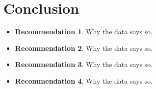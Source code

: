 \documentclass[12pt, letterpaper]{article}  %
\theoremstyle{definition}
\theoremstyle{remark}
\theoremstyle{plain}
\begin{document}


\section{Conclusion}\label{sec:conclusion}



\begin{itemize}
\item \textbf{Recommendation 1}.  Why the data says so.
\item \textbf{Recommendation 2}.  Why the data says so.
\item \textbf{Recommendation 3}.  Why the data says so.
\item \textbf{Recommendation 4}.  Why the data says so.
\end{itemize}








\begin{thebibliography}{99}







\end{thebibliography}
\end{document}
